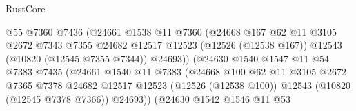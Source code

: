 \begin{lexlean}{RustCore}
\begin{coremodule}
                                      @55
                                      @7360
                                      @7436
                                      (@24661
                                        @1538
                                        @11
                                        @7360
                                        (@24668
                                          @167
                                          @62
                                          @11
                                          @3105
                                          @2672
                                          @7343
                                          @7355
                                          @24682
                                          @12517
                                          @12523
                                          (@12526 (@12538 @167))
                                          @12543
                                          (@10820 (@12545 @7355 @7344))
                                          @24693))
                                      (@24630
                                        @1540
                                        @1547
                                        @11
                                        @54
                                        @7383
                                        @7435
                                        (@24661
                                          @1540
                                          @11
                                          @7383
                                          (@24668
                                            @100
                                            @62
                                            @11
                                            @3105
                                            @2672
                                            @7365
                                            @7378
                                            @24682
                                            @12517
                                            @12523
                                            (@12526 (@12538 @100))
                                            @12543
                                            (@10820 (@12545 @7378 @7366))
                                            @24693))
                                        (@24630
                                          @1542
                                          @1546
                                          @11
                                          @53

\end{coremodule}
\end{lexlean}
